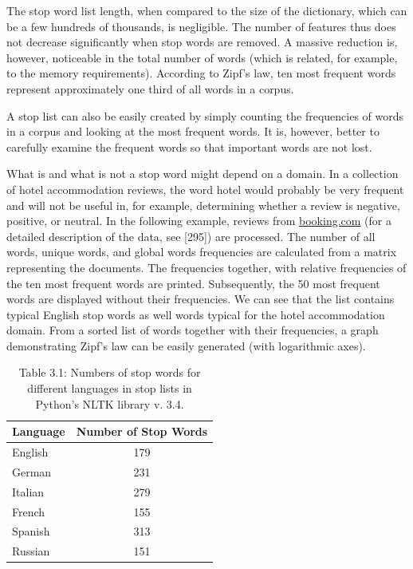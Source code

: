 \documentclass[10pt]{book}
\begin{document}
The stop word list length, when compared to the size of the dictionary, which can be a few hundreds of thousands, is negligible. The number of features thus does not decrease significantly when stop words are removed. A massive reduction is, however, noticeable in the total number of words (which is related, for example, to the memory requirements). According to Zipf's law, ten most frequent words represent approximately one third of all words in a corpus.

A stop list can also be easily created by simply counting the frequencies of words in a corpus and looking at the most frequent words. It is, however, better to carefully examine the frequent words so that important words are not lost.

What is and what is not a stop word might depend on a domain. In a collection of hotel accommodation reviews, the word hotel would probably be very frequent and will not be useful in, for example, determining whether a review is negative, positive, or neutral. In the following example, reviews from \href{http://booking.com}{booking.com} (for a detailed description of the data, see [295]) are processed. The number of all words, unique words, and global words frequencies are calculated from a matrix representing the documents. The frequencies together, with relative frequencies of the ten most frequent words are printed. Subsequently, the 50 most frequent words are displayed without their frequencies. We can see that the list contains typical English stop words as well words typical for the hotel accommodation domain. From a sorted list of words together with their frequencies, a graph demonstrating Zipf's law can be easily generated (with logarithmic axes).

\begin{table}[h]
\begin{center}
\captionsetup{labelformat=empty}
\caption{Table 3.1: Numbers of stop words for different languages in stop lists in Python's NLTK library v. 3.4.}
\begin{tabular}{l|c}
\hline
Language & Number of Stop Words \\
\hline
English & 179 \\
German & 231 \\
Italian & 279 \\
French & 155 \\
Spanish & 313 \\
Russian & 151 \\
\hline
\end{tabular}
\end{center}
\end{table}
\end{document}
